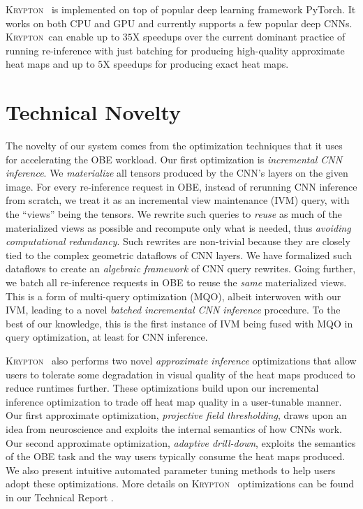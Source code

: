 \documentclass{article}
\newcommand{\system}{\textsc{Krypton}}
\begin{document}
\system~ is implemented on top of popular deep learning framework PyTorch. It works on both CPU and GPU and currently supports a few popular deep CNNs. \system ~can enable up to $35$X speedups over the current dominant practice of running re-inference with just batching for producing high-quality approximate heat maps and up to $5$X speedups for producing exact heat maps.

\vspace{-2mm}
\section{Technical Novelty}
The novelty of our system comes from the optimization techniques that it uses for accelerating the OBE workload.
Our first optimization is \textit{incremental CNN inference}. We \textit{materialize} all tensors produced by the CNN's layers on the given image. For every re-inference request in OBE, instead of rerunning CNN inference from scratch, we treat it as an incremental view maintenance (IVM) query, with the ``views'' being the tensors. We rewrite such queries to \textit{reuse} as much of the materialized views as possible and recompute only what is needed, thus \textit{avoiding computational redundancy}. Such rewrites are non-trivial because they are closely tied to the complex geometric dataflows of CNN layers. We have formalized such dataflows to create an \textit{algebraic framework} of CNN query rewrites. Going further, we batch all re-inference requests in OBE to reuse the \textit{same} materialized views. This is a form of multi-query optimization (MQO), albeit interwoven with our IVM, leading to a novel \textit{batched incremental CNN inference} procedure. To the best of our knowledge, this is the first instance of IVM being fused with MQO in query optimization, at least for CNN inference.

\system~ also performs two novel \textit{approximate inference} optimizations that allow users to tolerate some degradation in visual quality of the heat maps produced to reduce runtimes further. These optimizations build upon our incremental inference optimization to trade off heat map quality in a user-tunable manner. Our first approximate optimization, \textit{projective field thresholding}, draws upon an idea from neuroscience and exploits the internal semantics of how CNNs work. Our second approximate optimization, \textit{adaptive drill-down}, exploits the semantics of the OBE task and the way users typically consume the heat maps produced. We also present intuitive automated parameter tuning methods to help users adopt these optimizations.
More details on \system~ optimizations can be found in our Technical Report \cite{krypton}.
\end{document}
